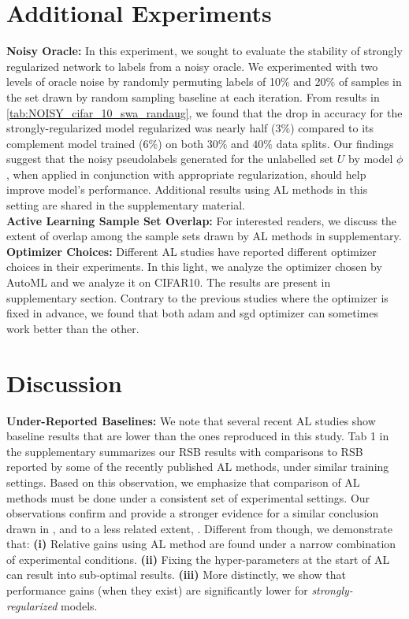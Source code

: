 \documentclass[10pt,twocolumn,letterpaper]{article}
\begin{document}
\section{Additional Experiments}

\label{noisyoracle}
\noindent \textbf{Noisy Oracle:} In this experiment, we sought to evaluate the stability of strongly regularized network to labels from a noisy oracle. We experimented with two levels of oracle noise by randomly permuting labels of 10\% and 20\% of samples in the set drawn by random sampling baseline at each iteration.
From results in \cref{tab:NOISY_cifar_10_swa_randaug}, we found that the drop in accuracy for the strongly-regularized model regularized was nearly half ($3\%$) compared to its complement model trained 
($6\%$) on both $30\%$ and $40\%$ data splits. Our findings suggest that the noisy pseudolabels generated for the unlabelled set $U$ by model $\phi$, when applied in conjunction with appropriate regularization, should help improve model's performance. Additional results using AL methods in this setting are shared in the supplementary material.\\

\noindent \textbf{Active Learning Sample Set Overlap:} For interested readers, we discuss the extent of overlap among the sample sets drawn by AL methods in supplementary. \\

\noindent \textbf{Optimizer Choices:} Different AL studies have reported different optimizer choices in their experiments. In this light, we analyze the optimizer chosen by AutoML and we analyze it on CIFAR10. The results are present in supplementary section. Contrary to the previous studies where the optimizer is fixed in advance, we found that both adam and sgd optimizer can sometimes work better than the other.


\section{Discussion}

\noindent \textbf{Under-Reported Baselines:} We note that several recent AL studies show baseline results that are lower than the ones reproduced in this study. Tab 1 in the supplementary summarizes our RSB results with comparisons to RSB reported by some of the recently published AL methods, under similar training settings. Based on this observation, we emphasize that comparison of AL methods must be done under a consistent set of experimental settings. Our observations confirm and provide a stronger evidence for a similar conclusion drawn in \cite{mittal2019parting}, and to a less related extent, \cite{oliver2018realistic_ssl}. Different from \cite{mittal2019parting} though, we demonstrate that: \textbf{(i)} Relative gains using AL method are found under a narrow combination of experimental conditions. \textbf{(ii)} Fixing the hyper-parameters at the start of AL can result into sub-optimal results. \textbf{(iii)} More distinctly, we show that performance gains (when they exist) are significantly lower for \textit{strongly-regularized} models.\\
\end{document}
